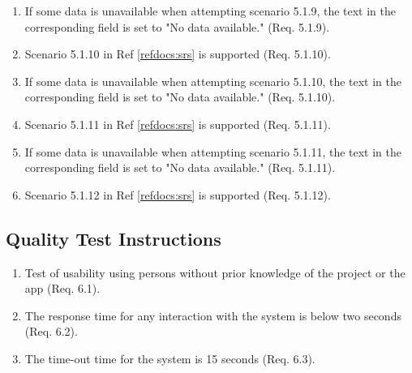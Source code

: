 \documentclass[a4paper]{article}
\newlength{\testlabellength}
\newenvironment{testlist}{\begin{enumerate}[label=\bfseries Instruction \thesubsection.\arabic* , labelindent=0pt, labelwidth=\testlabellength , leftmargin=2cm]}{\end{enumerate}}
\begin{document}
\begin{appendices}
\begin{testlist}
	\item If some data is unavailable when attempting scenario 5.1.9, the text in the corresponding field is set to "No data available." (Req. 5.1.9).
	
	\item Scenario 5.1.10 in Ref \ref{refdocs:srs} is supported (Req. 5.1.10).
	
	\item If some data is unavailable when attempting scenario 5.1.10, the text in the corresponding field is set to "No data available." (Req. 5.1.10).
	
	\item Scenario 5.1.11 in Ref \ref{refdocs:srs} is supported (Req. 5.1.11).
	
	\item If some data is unavailable when attempting scenario 5.1.11, the text in the corresponding field is set to "No data available." (Req. 5.1.11).
	
	\item Scenario 5.1.12 in Ref \ref{refdocs:srs} is supported (Req. 5.1.12).
\end{testlist}

\subsection{Quality Test Instructions}

\begin{testlist}
	\item Test of usability using persons without prior knowledge of the project or the app (Req. 6.1).
	
	\item The response time for any interaction with the system is below two seconds (Req. 6.2).
	
	\item The time-out time for the system is 15 seconds (Req. 6.3). 
	
\end{testlist}

\clearpage

\end{appendices}
\end{document}
